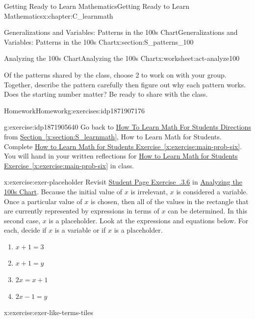 \documentclass[oneside,10pt,]{book}
\newcommand{\xreffont}{\relax}
\numberwithin{equation}{chapter}
\begin{document}
\begin{chapterptx}{Getting Ready to Learn Mathematics}{}{Getting Ready to Learn Mathematics}{}{}{x:chapter:C_learnmath}
\begin{sectionptx}{Generalizations and Variables: Patterns in the 100s Chart}{}{Generalizations and Variables: Patterns in the 100s Chart}{}{}{x:section:S_patterns_100}
\begin{worksheet-subsection}{Analyzing the 100s Chart}{}{Analyzing the 100s Chart}{}{}{x:worksheet:act-analyze100}
\begin{conclusion}{}
\par
Of the patterns shared by the class, choose 2 to work on with your group. Together, describe the pattern carefully then figure out why each pattern works. Does the starting number matter? Be ready to share with the class.%
\end{conclusion}%
\end{worksheet-subsection}
\restoregeometry
%
%
\typeout{************************************************}
\typeout{************************************************}
%
\begin{exercises-subsection}{Homework}{}{Homework}{}{}{g:exercises:idp1871907176}
\begin{divisionexercise}{1}{}{}{g:exercise:idp1871905640}%
Go back to \hyperlink{x:paragraphs:htlmfs-directions}{How To Learn Math For Students Directions} from \hyperref[x:section:S_learnmath]{Section~{\xreffont\ref{x:section:S_learnmath}}}, How to Learn Math for Students. Complete \hyperref[x:exercise:main-prob-six]{How to Learn Math for Students Exercise~{\xreffont\ref{x:exercise:main-prob-six}}}. You will hand in your written reflections for \hyperref[x:exercise:main-prob-six]{How to Learn Math for Students Exercise~{\xreffont\ref{x:exercise:main-prob-six}}} in class.%
\end{divisionexercise}%
\begin{divisionexercise}{2}{}{}{x:exercise:exer-placeholder}%
Revisit \hyperlink{x:exercise:analyze100-x}{Student Page Exercise~{\xreffont 1.6.3.6}} in \hyperref[x:worksheet:act-analyze100]{Analyzing the 100s Chart}. Because the initial value of \(x\) is irrelevant, \(x\) is considered a variable. Once a particular value of \(x\) is chosen, then all of the values in the rectangle that are currently represented by expressions in terms of \(x\) can be determined. In this second case, \(x\) is a placeholder. Look at the expressions and equations below. For each, decide if \(x\) is a variable or if \(x\) is a placeholder.%
\begin{enumerate}[font=\bfseries,label=(\alph*),ref=\alph*]
\item{}\(x + 1 = 3\)%
\item{}\(x + 1 = y\)%
\item{}\(2x = x + 1\)%
\item{}\(2x - 1 = y\)%
\end{enumerate}
\end{divisionexercise}%
\begin{divisionexercise}{3}{}{}{x:exercise:exer-like-terms-tiles}%

\end{divisionexercise}
\end{exercises-subsection}
\end{sectionptx}
\end{chapterptx}
\end{document}
